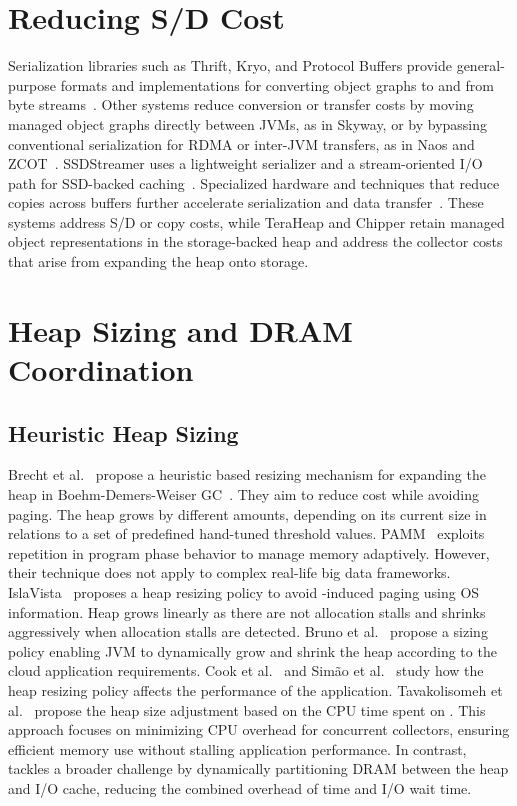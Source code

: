 \section{Reducing S/D Cost}

Serialization libraries such as Thrift, Kryo, and Protocol Buffers provide general-purpose formats and implementations for converting object graphs to and from byte streams~\cite{thrift,kryo,protocol-buffers}.
Other systems reduce conversion or transfer costs by moving managed object graphs directly between JVMs, as in Skyway, or by bypassing conventional serialization for RDMA or inter-JVM transfers, as in Naos and ZCOT~\cite{nguyen:skyway,taranov:naos,wu:zero_change}.
SSDStreamer uses a lightweight serializer and a stream-oriented I/O path for SSD-backed caching~\cite{ssdstreamer}.
Specialized hardware and techniques that reduce copies across buffers further accelerate serialization and data transfer~\cite{jang:arch,pourhabibi:optimus,matei:champions,ibanez:zerializer}.
These systems address S/D or copy costs, while TeraHeap and Chipper retain managed object representations in the storage-backed heap and address the collector costs that arise from expanding the heap onto storage.

\section{Heap Sizing and DRAM Coordination}

\subsection{Heuristic Heap Sizing}
Brecht et al.~\cite{brecht:nogc} propose a heuristic based resizing mechanism for expanding the heap in Boehm-Demers-Weiser GC~\cite{boehm:gc}.
They aim to reduce \flexheapGC{} cost while avoiding paging.
The heap grows by different amounts, depending on its current size in relations to a set of predefined
hand-tuned threshold values. %
%
PAMM~\cite{zhang:pamm} exploits repetition in program phase behavior to manage memory adaptively.
However, their technique does not apply to complex real-life big data frameworks.
%
IslaVista~\cite{grz:isla_vista} proposes a heap resizing policy to avoid \flexheapGC{}-induced paging using OS information.
Heap grows linearly as there are not allocation stalls and shrinks aggressively when allocation stalls are detected.
%
Bruno et al.~\cite{bruno:resize} propose a sizing policy enabling JVM to dynamically grow and shrink the heap according to the cloud application requirements.
%
Cook et al.~\cite{cook:auto} and Sim{\~a}o et al.~\cite{simao:adaptability} study how the \flexheapGC{} heap resizing policy affects the performance of the application.
%
Tavakolisomeh et al.~\cite{zgc:heap_resize} propose the heap size adjustment based on the CPU time spent on \flexheapGC{}.
This approach focuses on minimizing CPU overhead for concurrent collectors, ensuring efficient memory use without stalling application performance.
%
In contrast, \flexheapName{} tackles a broader challenge by dynamically partitioning DRAM between the heap and I/O cache, reducing the combined overhead of \flexheapGC{} time and I/O wait time.

